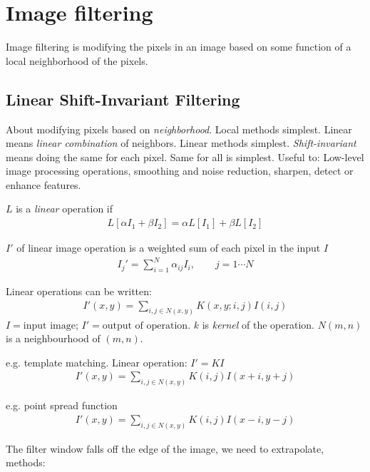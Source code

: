 \chapter{Image filtering}
Image filtering is modifying the pixels in an image based on some function of a local neighborhood of the pixels.
\section{Linear Shift-Invariant Filtering}
About modifying pixels based on \emph{neighborhood}. Local methods simplest. Linear means \emph{linear combination} of neighbors. Linear methods simplest. \emph{Shift-invariant} means doing the same for each pixel. Same for all is simplest. Useful to: Low-level image processing operations, smoothing and noise reduction, sharpen, detect or enhance features.
\begin{compactdesc}
	\item[\lp{Linear operation}] $L$ is a \emph{linear} operation if 
		\begin{gather*}
			L\!\left[ \alpha I_1+\beta I_2 \right]=\alpha L[I_1]+\beta L[I_2]
		\end{gather*}
	\item[\lp{Output}] $I'$ of linear image operation is a weighted sum of each pixel in the input $I$
		\begin{gather*}
			I_j'={\scriptstyle \sum_{i=1}^{N}}\alpha_{ij}I_i,\qquad j=1\cdots N
		\end{gather*}
	\item[\lp{Linear Filtering}] Linear operations can be written:
		\begin{gather*}
			I'(x,y)={\scriptstyle\sum_{i,j\in N(x,y)}^{}}K(x,y;i,j)I(i,j)
		\end{gather*}
		$I=\text{input image}$; $I'=\text{output of operation}$. $k$ is \emph{kernel} of the operation. $N(m,n)$ is a neighbourhood of $(m,n)$.
	\item[\lp{Correlation}] e.g. template matching. Linear operation: $I'=KI$ 
		\begin{gather*}
			I'(x,y)={\scriptstyle \sum_{i,j\in N(x,y)}^{}}K(i,j)I(x+i,y+j)
		\end{gather*}
	\item[\lp{Convolution}] e.g. point spread function
		\begin{align*}
			I'(x,y)={\scriptstyle\sum}_{i,j\in N(x,y)}^{} K(i,j)I(x-i,y-j)
		\end{align*}
	\item[\lp{Edge}] The filter window falls off the edge of the image, we need to extrapolate, methods:

\end{compactdesc}
